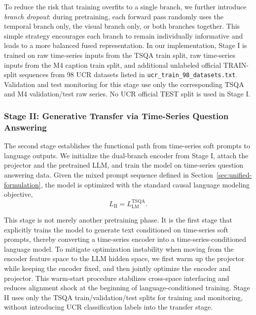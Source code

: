 \documentclass{article}
\begin{document}
        To reduce the risk that training overfits to a single branch, we further introduce \emph{branch dropout}: during pretraining, each forward pass randomly uses the temporal branch only, the visual branch only, or both branches together.
        This simple strategy encourages each branch to remain individually informative and leads to a more balanced fused representation.
        In our implementation, Stage I is trained on raw time-series inputs from the TSQA train split, raw time-series inputs from the M4 caption train split, and additional unlabeled official TRAIN-split sequences from 98 UCR datasets listed in \texttt{ucr\_train\_98\_datasets.txt}.
        Validation and test monitoring for this stage use only the corresponding TSQA and M4 validation/test raw series.
        No UCR official TEST split is used in Stage I.
    
        \subsubsection{Stage II: Generative Transfer via Time-Series Question Answering}
        
        The second stage establishes the functional path from time-series soft prompts to language outputs.
        We initialize the dual-branch encoder from Stage I, attach the projector and the pretrained LLM, and train the model on time-series question answering data.
        Given the mixed prompt sequence defined in Section~\ref{sec:unified-formulation}, the model is optimized with the standard causal language modeling objective,
        \begin{equation}
        L_{\mathrm{II}} = L_{\mathrm{LM}}^{\mathrm{TSQA}}.
        \end{equation}
        
        This stage is not merely another pretraining phase.
        It is the first stage that explicitly trains the model to generate text conditioned on time-series soft prompts, thereby converting a time-series encoder into a time-series-conditioned language model.
        To mitigate optimization instability when moving from the encoder feature space to the LLM hidden space, we first warm up the projector while keeping the encoder fixed, and then jointly optimize the encoder and projector.
        This warm-start procedure stabilizes cross-space interfacing and reduces alignment shock at the beginning of language-conditioned training.
        Stage II uses only the TSQA train/validation/test splits for training and monitoring, without introducing UCR classification labels into the transfer stage.
        
\end{document}
